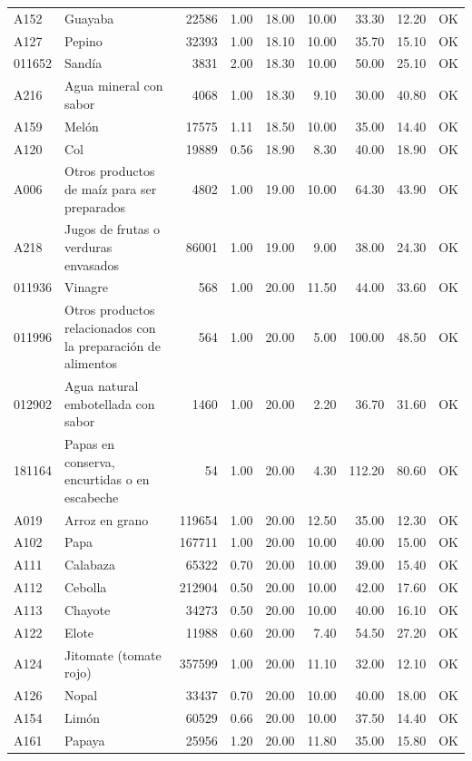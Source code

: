 \begin{table}[ht]
\begin{tabular}{llrrrrrrl}
  A152 & Guayaba & 22586 & 1.00 & 18.00 & 10.00 & 33.30 & 12.20 & OK \\ 
  A127 & Pepino & 32393 & 1.00 & 18.10 & 10.00 & 35.70 & 15.10 & OK \\ 
  011652 & Sandía & 3831 & 2.00 & 18.30 & 10.00 & 50.00 & 25.10 & OK \\ 
  A216 & Agua mineral con sabor & 4068 & 1.00 & 18.30 & 9.10 & 30.00 & 40.80 & OK \\ 
  A159 & Melón & 17575 & 1.11 & 18.50 & 10.00 & 35.00 & 14.40 & OK \\ 
  A120 & Col & 19889 & 0.56 & 18.90 & 8.30 & 40.00 & 18.90 & OK \\ 
  A006 & Otros productos de maíz para ser preparados & 4802 & 1.00 & 19.00 & 10.00 & 64.30 & 43.90 & OK \\ 
  A218 & Jugos de frutas o verduras envasados & 86001 & 1.00 & 19.00 & 9.00 & 38.00 & 24.30 & OK \\ 
  011936 & Vinagre & 568 & 1.00 & 20.00 & 11.50 & 44.00 & 33.60 & OK \\ 
  011996 & Otros productos relacionados con la preparación de alimentos & 564 & 1.00 & 20.00 & 5.00 & 100.00 & 48.50 & OK \\ 
  012902 & Agua natural embotellada con sabor & 1460 & 1.00 & 20.00 & 2.20 & 36.70 & 31.60 & OK \\ 
  181164 & Papas en conserva, encurtidas o en escabeche &  54 & 1.00 & 20.00 & 4.30 & 112.20 & 80.60 & OK \\ 
  A019 & Arroz en grano & 119654 & 1.00 & 20.00 & 12.50 & 35.00 & 12.30 & OK \\ 
  A102 & Papa & 167711 & 1.00 & 20.00 & 10.00 & 40.00 & 15.00 & OK \\ 
  A111 & Calabaza & 65322 & 0.70 & 20.00 & 10.00 & 39.00 & 15.40 & OK \\ 
  A112 & Cebolla & 212904 & 0.50 & 20.00 & 10.00 & 42.00 & 17.60 & OK \\ 
  A113 & Chayote & 34273 & 0.50 & 20.00 & 10.00 & 40.00 & 16.10 & OK \\ 
  A122 & Elote & 11988 & 0.60 & 20.00 & 7.40 & 54.50 & 27.20 & OK \\ 
  A124 & Jitomate (tomate rojo) & 357599 & 1.00 & 20.00 & 11.10 & 32.00 & 12.10 & OK \\ 
  A126 & Nopal & 33437 & 0.70 & 20.00 & 10.00 & 40.00 & 18.00 & OK \\ 
  A154 & Limón & 60529 & 0.66 & 20.00 & 10.00 & 37.50 & 14.40 & OK \\ 
  A161 & Papaya & 25956 & 1.20 & 20.00 & 11.80 & 35.00 & 15.80 & OK \\ 

\end{tabular}
\end{table}
